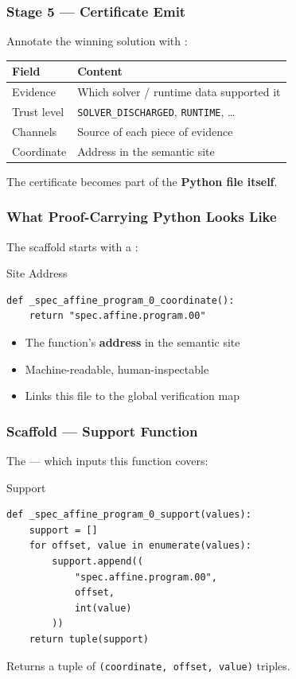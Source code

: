 \begin{frame}
\frametitle{Stage 5 --- Certificate Emit}
Annotate the winning solution with :
\vspace{8pt}
\begin{center}
\renewcommand{\arraystretch}{1.4}
\begin{tabular}{l l}
  \toprule
  \textbf{Field} & \textbf{Content} \\
  \midrule
  Evidence     & Which solver / runtime data supported it \\
  Trust level  & \texttt{SOLVER\_DISCHARGED}, \texttt{RUNTIME}, \ldots \\
  Channels     & Source of each piece of evidence \\
  Coordinate   & Address in the semantic site \\
  \bottomrule
\end{tabular}
\end{center}
\vspace{6pt}
The certificate becomes part of the \textbf{Python file itself}.
\end{frame}

\begin{frame}[fragile]
\frametitle{What Proof-Carrying Python Looks Like}
The scaffold starts with a :
\vspace{4pt}
\begin{block}{Site Address}
\begin{lstlisting}
def _spec_affine_program_0_coordinate():
    return "spec.affine.program.00"
\end{lstlisting}
\end{block}
\vspace{6pt}
\begin{itemize}
  \item The function's \textbf{address} in the semantic site
  \item Machine-readable, human-inspectable
  \item Links this file to the global verification map
\end{itemize}
\end{frame}

\begin{frame}[fragile]
\frametitle{Scaffold --- Support Function}
The  --- which inputs this function covers:
\vspace{4pt}
\begin{block}{Support}
\begin{lstlisting}
def _spec_affine_program_0_support(values):
    support = []
    for offset, value in enumerate(values):
        support.append((
            "spec.affine.program.00",
            offset,
            int(value)
        ))
    return tuple(support)
\end{lstlisting}
\end{block}
\vspace{4pt}
Returns a tuple of \texttt{(coordinate, offset, value)} triples.
\end{frame}

